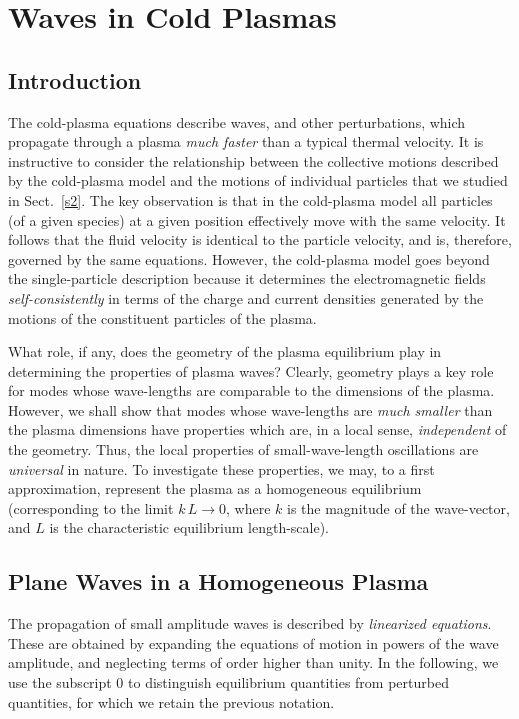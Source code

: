 \chapter {Waves in Cold  Plasmas}\label{s4}
\section{Introduction}
The cold-plasma equations describe waves, and other perturbations, which
propagate through a plasma {\em much faster}\/ than a typical thermal velocity.
It is instructive to consider the relationship between the collective
motions described by the cold-plasma model and the motions of individual
particles that we studied in Sect.~\ref{s2}. The key observation is that in the
cold-plasma model all  particles (of a given species) at a given position effectively move with the
same velocity. It follows that the fluid velocity is identical to the particle
velocity, and is, therefore, governed by the same equations. 
However, the cold-plasma
model goes beyond the single-particle description because it determines the
electromagnetic fields {\em self-consistently}\/ in terms of the
charge and current densities generated by the motions of the 
constituent particles of the  plasma. 

What role, if any, does the geometry of the plasma equilibrium play in
determining the properties of plasma waves? Clearly, geometry plays a
key role for modes whose wave-lengths are comparable to the dimensions of
the plasma. However, we shall show that modes whose wave-lengths are 
{\em much
smaller}\/ than the plasma dimensions 
have properties which are, in a local sense, {\em independent}\/ of the
geometry. Thus, the local properties of small-wave-length oscillations are 
{\em universal}\/ in nature. To investigate these properties, we
may, to a first approximation, represent the plasma as a homogeneous
equilibrium (corresponding to the limit $k\,L\rightarrow 0$, where $k$
is the magnitude of the wave-vector, and $L$ is the characteristic
equilibrium length-scale). 

\section{Plane Waves in a Homogeneous Plasma}\label{s4.2}
The propagation of small amplitude waves is described by {\em linearized equations}.
These are obtained by expanding the equations of motion in powers
of the wave amplitude, and neglecting terms of order higher than unity.
In the following, we use the subscript 0 to distinguish equilibrium
quantities from perturbed quantities, for which we retain the previous
notation. 

